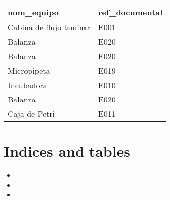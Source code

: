 \documentclass[letterpaper,10pt,spanish]{sphinxmanual}
\begin{document}
\begin{savenotes}\sphinxattablestart
\centering
\begin{tabulary}{\linewidth}[t]{|T|T|}
\hline
\sphinxstyletheadfamily 
nom\_equipo
&\sphinxstyletheadfamily 
ref\_documental
\\
\hline
Cabina de flujo laminar
&
E001
\\
\hline
Balanza
&
E020
\\
\hline
Balanza
&
E020
\\
\hline
Micropipeta
&
E019
\\
\hline
Incubadora
&
E010
\\
\hline
Balanza
&
E020
\\
\hline
Caja de Petri
&
E011
\\
\hline
\end{tabulary}
\par
\sphinxattableend\end{savenotes}


\chapter{Indices and tables}
\label{\detokenize{index:indices-and-tables}}\begin{itemize}
\item {} 

\item {} 

\item {} 

\end{itemize}



\renewcommand{\indexname}{Índice}
\printindex
\end{document}
